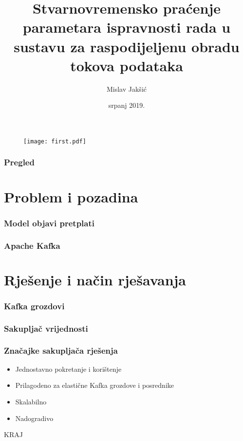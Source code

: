 \documentclass{beamer}
\title[Praćenje parametara ispravnosti]{Stvarnovremensko praćenje parametara ispravnosti rada u sustavu za raspodijeljenu obradu tokova podataka}
\author{Mislav Jakšić}
\institute[FER]
{
Sveučilište u Zagrebu \\ 
\medskip
\textit{jaksicmislav@gmail.com} 
}
\date{srpanj 2019.}
\begin{document}
\begin{frame}
\begin{figure}[H]
    \centering
    \texttt{[image: first.pdf]}
\end{figure}
\end{frame}



\begin{frame}
\frametitle{Pregled}

\tableofcontents
\end{frame}



\section{Problem i pozadina}

\begin{frame}
\frametitle{Model objavi pretplati}

\centering

\end{frame}

\begin{frame}
\frametitle{Apache Kafka}

\centering

\end{frame}



\section{Rješenje i način rješavanja}

\begin{frame}
\frametitle{Kafka grozdovi}

\centering

\end{frame}

\begin{frame}
\frametitle{Sakupljač vrijednosti}

\hspace*{-4mm}

\end{frame}

\begin{frame}
\frametitle{Značajke sakupljača rješenja}

\begin{itemize}
  \item Jednostavno pokretanje i korištenje
  \item Prilagodeno za elastične Kafka grozdove i posrednike
  \item Skalabilno
  \item Nadogradivo
\end{itemize}
\end{frame}

\begin{frame}
\centering
KRAJ
\end{frame}
\end{document}
